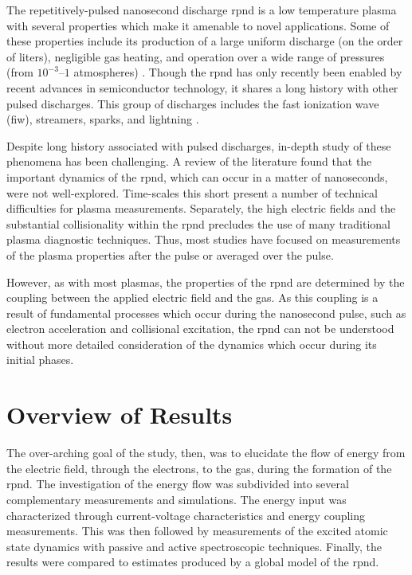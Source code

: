 The repetitively-pulsed nanosecond discharge \acs{rpnd} is a low temperature
plasma with several properties which make it amenable to novel applications.
Some of these properties include its production of a large uniform discharge (on
the order of liters), negligible gas heating, and operation over a wide range of
pressures (from $10^{-3}$--$1$ atmospheres) \cite{Starikovskaia2001}. Though the
\acs{rpnd} has only recently been enabled by recent advances in semiconductor
technology, it shares a long history with other pulsed discharges. This group of
discharges includes the fast ionization wave (\acs{fiw}), streamers, sparks, and
lightning \cite{Loeb1965}.

Despite long history associated with pulsed discharges, in-depth study of these
phenomena has been challenging. A review of the literature found that the
important dynamics of the \acs{rpnd}, which can occur in a matter of
nanoseconds, were not well-explored. Time-scales this short present a number of
technical difficulties for plasma measurements. Separately, the high electric
fields and the substantial collisionality within the \acs{rpnd} precludes the
use of many traditional plasma diagnostic techniques. Thus, most studies have
focused on measurements of the plasma properties after the pulse or averaged
over the pulse.

However, as with most plasmas, the properties of the \acs{rpnd} are determined
by the coupling between the applied electric field and the gas. As this coupling
is a result of fundamental processes which occur during the nanosecond pulse,
such as electron acceleration and collisional excitation, the \acs{rpnd} can not
be understood without more detailed consideration of the dynamics which occur
during its initial phases.

\section{Overview of Results}

The over-arching goal of the study, then, was to elucidate the flow of energy
from the electric field, through the electrons, to the gas, during the formation
of the \acs{rpnd}. The investigation of the energy flow was subdivided into
several complementary measurements and simulations. The energy input was
characterized through current-voltage characteristics and energy coupling
measurements. This was then followed by measurements of the excited atomic state
dynamics with passive and active spectroscopic techniques. Finally, the results
were compared to estimates produced by a global model of the \acs{rpnd}.

